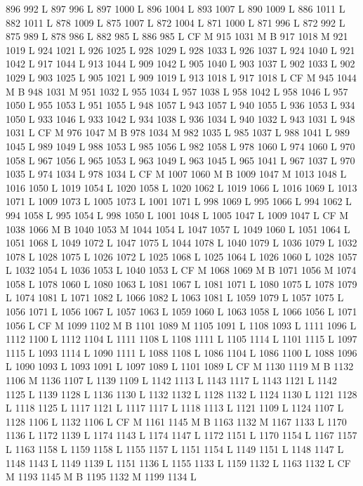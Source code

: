 {{{{{{{{{{{{{{{{{{{{{{{{{{{{{{896 992 L
897 996 L
897 1000 L
896 1004 L
893 1007 L
890 1009 L
886 1011 L
882 1011 L
878 1009 L
875 1007 L
872 1004 L
871 1000 L
871 996 L
872 992 L
875 989 L
878 986 L
882 985 L
886 985 L
CF M
915 1031 M B
917 1018 M 921 1019 L
924 1021 L
926 1025 L
928 1029 L
928 1033 L
926 1037 L
924 1040 L
921 1042 L
917 1044 L
913 1044 L
909 1042 L
905 1040 L
903 1037 L
902 1033 L
902 1029 L
903 1025 L
905 1021 L
909 1019 L
913 1018 L
917 1018 L
CF M
945 1044 M B
948 1031 M 951 1032 L
955 1034 L
957 1038 L
958 1042 L
958 1046 L
957 1050 L
955 1053 L
951 1055 L
948 1057 L
943 1057 L
940 1055 L
936 1053 L
934 1050 L
933 1046 L
933 1042 L
934 1038 L
936 1034 L
940 1032 L
943 1031 L
948 1031 L
CF M
976 1047 M B
978 1034 M 982 1035 L
985 1037 L
988 1041 L
989 1045 L
989 1049 L
988 1053 L
985 1056 L
982 1058 L
978 1060 L
974 1060 L
970 1058 L
967 1056 L
965 1053 L
963 1049 L
963 1045 L
965 1041 L
967 1037 L
970 1035 L
974 1034 L
978 1034 L
CF M
1007 1060 M B
1009 1047 M 1013 1048 L
1016 1050 L
1019 1054 L
1020 1058 L
1020 1062 L
1019 1066 L
1016 1069 L
1013 1071 L
1009 1073 L
1005 1073 L
1001 1071 L
998 1069 L
995 1066 L
994 1062 L
994 1058 L
995 1054 L
998 1050 L
1001 1048 L
1005 1047 L
1009 1047 L
CF M
1038 1066 M B
1040 1053 M 1044 1054 L
1047 1057 L
1049 1060 L
1051 1064 L
1051 1068 L
1049 1072 L
1047 1075 L
1044 1078 L
1040 1079 L
1036 1079 L
1032 1078 L
1028 1075 L
1026 1072 L
1025 1068 L
1025 1064 L
1026 1060 L
1028 1057 L
1032 1054 L
1036 1053 L
1040 1053 L
CF M
1068 1069 M B
1071 1056 M 1074 1058 L
1078 1060 L
1080 1063 L
1081 1067 L
1081 1071 L
1080 1075 L
1078 1079 L
1074 1081 L
1071 1082 L
1066 1082 L
1063 1081 L
1059 1079 L
1057 1075 L
1056 1071 L
1056 1067 L
1057 1063 L
1059 1060 L
1063 1058 L
1066 1056 L
1071 1056 L
CF M
1099 1102 M B
1101 1089 M 1105 1091 L
1108 1093 L
1111 1096 L
1112 1100 L
1112 1104 L
1111 1108 L
1108 1111 L
1105 1114 L
1101 1115 L
1097 1115 L
1093 1114 L
1090 1111 L
1088 1108 L
1086 1104 L
1086 1100 L
1088 1096 L
1090 1093 L
1093 1091 L
1097 1089 L
1101 1089 L
CF M
1130 1119 M B
1132 1106 M 1136 1107 L
1139 1109 L
1142 1113 L
1143 1117 L
1143 1121 L
1142 1125 L
1139 1128 L
1136 1130 L
1132 1132 L
1128 1132 L
1124 1130 L
1121 1128 L
1118 1125 L
1117 1121 L
1117 1117 L
1118 1113 L
1121 1109 L
1124 1107 L
1128 1106 L
1132 1106 L
CF M
1161 1145 M B
1163 1132 M 1167 1133 L
1170 1136 L
1172 1139 L
1174 1143 L
1174 1147 L
1172 1151 L
1170 1154 L
1167 1157 L
1163 1158 L
1159 1158 L
1155 1157 L
1151 1154 L
1149 1151 L
1148 1147 L
1148 1143 L
1149 1139 L
1151 1136 L
1155 1133 L
1159 1132 L
1163 1132 L
CF M
1193 1145 M B
1195 1132 M 1199 1134 L
}}}}}}}}}}}}}}}}}}}}}}}}}}}}}}
